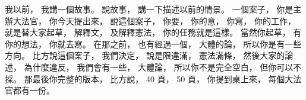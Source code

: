 \hypertarget{w01:cue:1050}{}我以前，
\hypertarget{w01:cue:1051}{}我講一個故事。
\hypertarget{w01:cue:1052}{}說故事，
\hypertarget{w01:cue:1053}{}講一下描述以前的情景。
\hypertarget{w01:cue:1054}{}一個案子，
\hypertarget{w01:cue:1055}{}你是主辦大法官，
\hypertarget{w01:cue:1056}{}你今天提出來，
\hypertarget{w01:cue:1057}{}說這個案子，
\hypertarget{w01:cue:1058}{}你要，
\hypertarget{w01:cue:1059}{}你的意，
\hypertarget{w01:cue:1060}{}你寫，
\hypertarget{w01:cue:1061}{}你的工作，
\hypertarget{w01:cue:1062}{}就是替大家起草，
\hypertarget{w01:cue:1063}{}解釋文，
\hypertarget{w01:cue:1064}{}及解釋憲法，
\hypertarget{w01:cue:1065}{}你的任務就是這樣。
\hypertarget{w01:cue:1066}{}當然你起草，
\hypertarget{w01:cue:1067}{}有你的想法，
\hypertarget{w01:cue:1068}{}你就去寫。
\hypertarget{w01:cue:1069}{}在那之前，
\hypertarget{w01:cue:1070}{}也有經過一個，
\hypertarget{w01:cue:1071}{}大體的論，
\hypertarget{w01:cue:1072}{}所以你是有一些方向。
\hypertarget{w01:cue:1073}{}比方說這個案子，
\hypertarget{w01:cue:1074}{}我們決定，
\hypertarget{w01:cue:1075}{}說是限違滿，
\hypertarget{w01:cue:1076}{}憲法滿條，
\hypertarget{w01:cue:1077}{}然後大家的論述，
\hypertarget{w01:cue:1078}{}為什麼違反，
\hypertarget{w01:cue:1079}{}我們會有一些，
\hypertarget{w01:cue:1080}{}大體論，
\hypertarget{w01:cue:1081}{}所以你不是完全空白，
\hypertarget{w01:cue:1082}{}但你可以不採。
\hypertarget{w01:cue:1083}{}那最後你完整的版本，
\hypertarget{w01:cue:1084}{}比方說，
\hypertarget{w01:cue:1085}{}40 頁，
\hypertarget{w01:cue:1086}{}50 頁，
\hypertarget{w01:cue:1087}{}你提到桌上來，
\hypertarget{w01:cue:1088}{}每個大法官都有一份。

